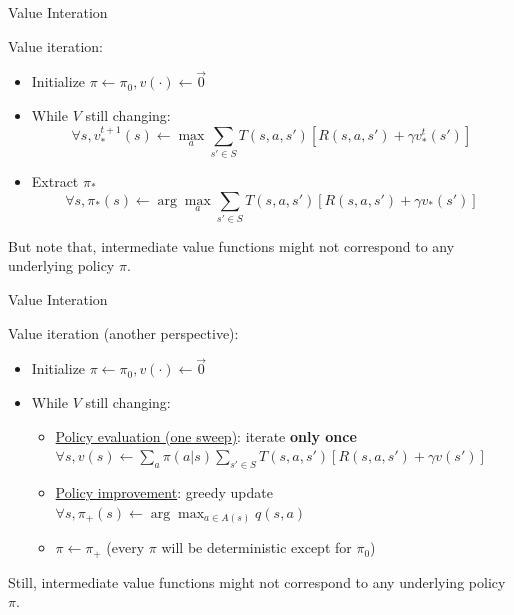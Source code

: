 \documentclass{beamer}
\begin{document}
\begin{frame}{Value Interation}
    \begin{exampleblock}{Value iteration:}
  	\begin{itemize}
  		\item Initialize $\pi \gets \pi_0, v(\cdot) \gets \vec{0}$
  		\item While $V$ still changing:
  		\[
  		\forall s,
  		v_*^{t+1}(s)
  		\gets \max_a \sum_{s'\in S} T(s, a, s')[R(s, a, s') + \gamma v_*^t(s')]
  		\]
  		\item Extract $\pi_*$
  		\[
  		\forall s, \pi_*(s) \gets \arg\max_a \sum_{s'\in S} T(s, a, s')[R(s, a, s') + \gamma v_*(s')]
  		\]
  	\end{itemize}
    \end{exampleblock}
    
\alert{But note that, intermediate value functions might not correspond to any underlying policy $\pi$.}
\end{frame}

\begin{frame}{Value Interation}
    \begin{exampleblock}{Value iteration (another perspective):}
  	\begin{itemize}
  		\item Initialize $\pi \gets \pi_0, v(\cdot) \gets \vec{0}$
  		\item While $V$ still changing:
  		\begin{itemize}
  			\item \underline{Policy evaluation (one sweep)}: iterate \textbf{only once}
  			$\forall s,
  			v(s) \gets \sum_a \pi(a|s)\sum_{s'\in S} T(s, a, s')[R(s, a, s') + \gamma v(s')]$
  			\item \underline{Policy improvement}: greedy update
			$\forall s,
			\pi_{+}(s) \gets \arg\max_{a\in A(s)} q(s, a)$
			
  			\item $\pi \gets \pi_{+}$ (every $\pi$ will be deterministic except for $\pi_0$)
  		\end{itemize}
  	\end{itemize}
    \end{exampleblock}
\alert{Still, intermediate value functions might not correspond to any underlying policy $\pi$.}
\end{frame}
\end{document}
